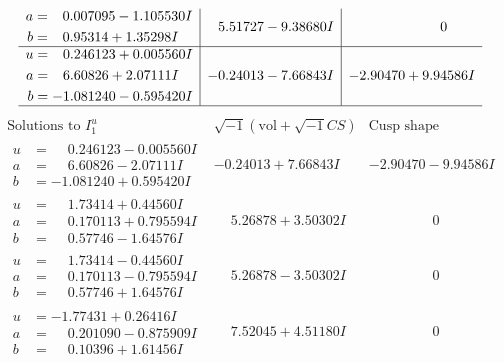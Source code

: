 \documentclass[1p]{elsarticle_modified}
\theoremstyle{definition}
\newcommand{\I}{\sqrt{-1}}
\begin{document}
$$\begin{array}{c|c|c}
\begin{aligned}
a &= \phantom{-}0.007095 - 1.105530 I \\
b &= \phantom{-}0.95314 + 1.35298 I\end{aligned}
 & \phantom{-}5.51727 - 9.38680 I & \phantom{-0.000000 } 0 \\ \hline\begin{aligned}
u &= \phantom{-}0.246123 + 0.005560 I \\
a &= \phantom{-}6.60826 + 2.07111 I \\
b &= -1.081240 - 0.595420 I\end{aligned}
 & -0.24013 - 7.66843 I & -2.90470 + 9.94586 I\\
 \hline 
 \end{array}$$\newpage$$\begin{array}{c|c|c}  
\text{Solutions to }I^u_{1}& \I (\text{vol} + \sqrt{-1}CS) & \text{Cusp shape}\\
 \hline 
\begin{aligned}
u &= \phantom{-}0.246123 - 0.005560 I \\
a &= \phantom{-}6.60826 - 2.07111 I \\
b &= -1.081240 + 0.595420 I\end{aligned}
 & -0.24013 + 7.66843 I & -2.90470 - 9.94586 I \\ \hline\begin{aligned}
u &= \phantom{-}1.73414 + 0.44560 I \\
a &= \phantom{-}0.170113 + 0.795594 I \\
b &= \phantom{-}0.57746 - 1.64576 I\end{aligned}
 & \phantom{-}5.26878 + 3.50302 I & \phantom{-0.000000 } 0 \\ \hline\begin{aligned}
u &= \phantom{-}1.73414 - 0.44560 I \\
a &= \phantom{-}0.170113 - 0.795594 I \\
b &= \phantom{-}0.57746 + 1.64576 I\end{aligned}
 & \phantom{-}5.26878 - 3.50302 I & \phantom{-0.000000 } 0 \\ \hline\begin{aligned}
u &= -1.77431 + 0.26416 I \\
a &= \phantom{-}0.201090 - 0.875909 I \\
b &= \phantom{-}0.10396 + 1.61456 I\end{aligned}
 & \phantom{-}7.52045 + 4.51180 I & \phantom{-0.000000 } 0 \\ \hline\begin{aligned}

\end{aligned}
\end{array}$$
\end{document}
